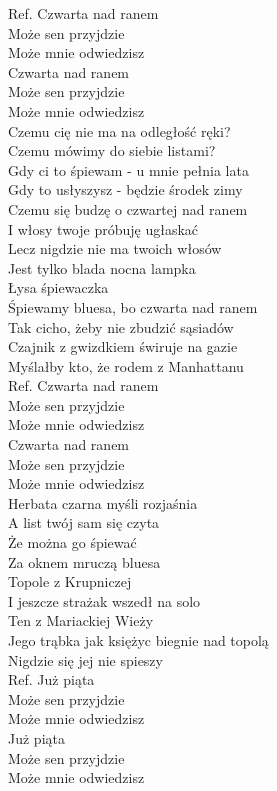 
Ref. Czwarta nad ranem \tab{} \\
 Może sen przyjdzie \tab{}\\
 Może mnie odwiedzisz \tab{}\\
 Czwarta nad ranem \tab{}\\
 Może sen przyjdzie \tab{}\\
 Może mnie odwiedzisz \tab{}\\
\hops
Czemu cię nie ma na odległość ręki? \\
Czemu mówimy do siebie listami? \\
Gdy ci to śpiewam - u mnie pełnia lata \\
Gdy to usłyszysz - będzie środek zimy \\ 
\hops
Czemu się budzę o czwartej nad ranem \\
I włosy twoje próbuję ugłaskać \\
Lecz nigdzie nie ma twoich włosów \\
Jest tylko blada nocna lampka\tab{} \\
Łysa śpiewaczka \tab{}\\
\hops
Śpiewamy bluesa, bo czwarta nad ranem \\
Tak cicho, żeby nie zbudzić sąsiadów \\
Czajnik z gwizdkiem świruje na gazie \\
Myślałby kto, że rodem z Manhattanu \\
\hops
Ref. Czwarta nad ranem \\
 Może sen przyjdzie \\
 Może mnie odwiedzisz \\
 Czwarta nad ranem \\
 Może sen przyjdzie \\
 Może mnie odwiedzisz \\
\hops
Herbata czarna myśli rozjaśnia \\
A list twój sam się czyta \\
Że można go śpiewać \\
Za oknem mruczą bluesa \\
Topole z Krupniczej\\
\hops
I jeszcze strażak wszedł na solo \\
Ten z Mariackiej Wieży \\
Jego trąbka jak księżyc biegnie nad topolą \\
Nigdzie się jej nie spieszy \\
\hops
Ref. Już piąta\\
 Może sen przyjdzie \\
 Może mnie odwiedzisz \\
 Już piąta \\
 Może sen przyjdzie \\
 Może mnie odwiedzisz \\